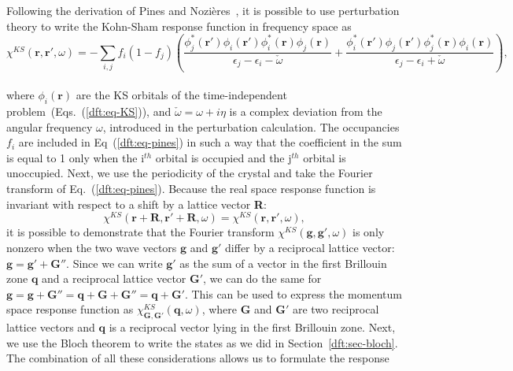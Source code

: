 \begin{refsection}
Following the derivation of Pines and Nozi\`eres~\cite{Nozieres1994}, it is 
possible to use perturbation theory to write the Kohn-Sham response function 
in frequency space as 
\begin{equation}\label{dft:eq-pines} 
\chi^{KS}(\mathbf{r},\mathbf{r}', \omega) = - \sum_{i,j} f_i \left(1 - f_j\right) \left( 
\frac{\phi_j^*(\mathbf{r'})\phi_i(\mathbf{r'})\phi_i^*(\mathbf{r})\phi_j(\mathbf{r})}{\epsilon_j 
- \epsilon_i - \check{\omega}} + 
\frac{\phi_i^*(\mathbf{r'})\phi_j(\mathbf{r'})\phi_j^*(\mathbf{r})\phi_i(\mathbf{r})}{\epsilon_j 
- \epsilon_i + \check{\omega}} \right), 
\end{equation} 
\\ 
where $\phi_i(\mathbf{r})$ are the \gls{KS} orbitals of the time-independent 
problem~(Eqs.~(\ref{dft:eq-KS})), and $\check{\omega} = \omega + i \eta$ is a 
complex deviation from the angular frequency $\omega$, introduced in the 
perturbation calculation. The occupancies $f_i$ are included in Eq~(\ref{dft:eq-pines}) in 
such a way that the coefficient in the sum is equal to 1 only when the 
i$^{th}$ orbital is occupied and the j$^{th}$ orbital is unoccupied. Next, we 
use the periodicity of the crystal and take the Fourier transform of 
Eq.~(\ref{dft:eq-pines}). Because the real space response function is invariant 
with respect to a shift by a lattice vector \textbf{R}:  
\begin{equation} 
\chi^{KS}(\mathbf{r} + \mathbf{R},\mathbf{r}' + \mathbf{R}, \omega) = 
\chi^{KS}(\mathbf{r},\mathbf{r}', \omega), 
\end{equation} 
it is possible to demonstrate that the Fourier transform 
$\chi^{KS}(\mathbf{g},\mathbf{g}',\omega)$ is only nonzero when the two wave 
vectors $\mathbf{g}$ and $\mathbf{g}'$ differ by a reciprocal lattice vector: 
$\mathbf{g} = \mathbf{g}' + \mathbf{G}''$. Since we can write $\mathbf{g}'$ as 
the sum of a vector in the first Brillouin zone $\mathbf{q}$ and a reciprocal 
lattice vector $\mathbf{G}'$, we can do the same for $\mathbf{g} = \mathbf{g} 
+ \mathbf{G}'' = \mathbf{q} + \mathbf{G} + \mathbf{G}'' = \mathbf{q} + 
\mathbf{G}'$. This can be used to express the momentum space response function 
as $\chi_{\mathbf{G},\mathbf{G}'}^{KS}(\mathbf{q},\omega)$, where $\mathbf{G}$ 
and $\mathbf{G}'$ are two reciprocal lattice vectors and $\mathbf{q}$ is a 
reciprocal vector lying in the first Brillouin zone. Next, we use the Bloch 
theorem to write the states as we did in Section~\ref{dft:sec-bloch}. The 
combination of all these considerations allows us to formulate the response 

\end{refsection}
